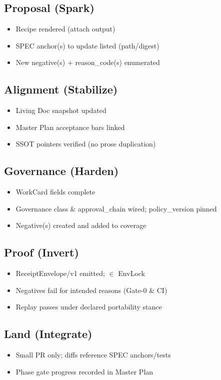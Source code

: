 \documentclass[11pt]{article}
\newcommand{\code}[1]{\path{#1}} %
\begin{document}
\subsection{Proposal (Spark)}
\begin{itemize}
  \item Recipe rendered (attach output)
  \item SPEC anchor(s) to update listed (path/digest)
  \item New negative(s) + reason\_code(s) enumerated
\end{itemize}
\subsection{Alignment (Stabilize)}
\begin{itemize}
  \item Living Doc snapshot updated
  \item Master Plan acceptance bars linked
  \item SSOT pointers verified (no prose duplication)
\end{itemize}
\subsection{Governance (Harden)}
\begin{itemize}
  \item WorkCard fields complete
  \item Governance class \& approval\_chain wired; policy\_version pinned
  \item Negative(s) created and added to coverage
\end{itemize}
\subsection{Proof (Invert)}
\begin{itemize}
  \item ReceiptEnvelope/v1 emitted; \code{checker_hash} $\in$ EnvLock
  \item Negatives fail for intended reasons (Gate-0 \& CI)
  \item Replay passes under declared portability stance
\end{itemize}
\subsection{Land (Integrate)}
\begin{itemize}
  \item Small PR only; diffs reference SPEC anchors/tests
  \item Phase gate progress recorded in Master Plan
\end{itemize}
\end{document}
